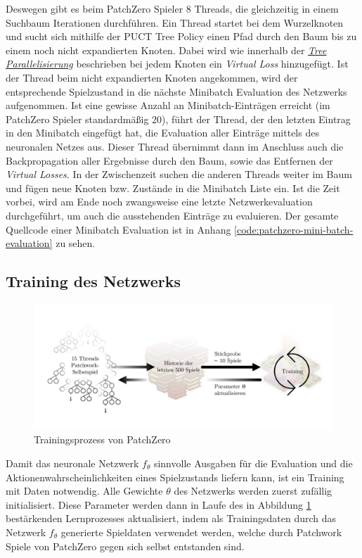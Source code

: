 Deswegen gibt es beim PatchZero Spieler 8 Threads, die gleichzeitig in einem Suchbaum Iterationen durchführen. Ein Thread startet bei dem Wurzelknoten und sucht sich mithilfe der PUCT Tree Policy einen Pfad durch den Baum bis zu einem noch nicht expandierten Knoten. Dabei wird wie innerhalb der \hyperref[text:tree-parallelization]{\emph{Tree Parallelisierung}} beschrieben bei jedem Knoten ein \emph{Virtual Loss} hinzugefügt. Ist der Thread beim nicht expandierten Knoten angekommen, wird der entsprechende Spielzustand in die nächste Minibatch Evaluation des Netzwerks aufgenommen. Ist eine gewisse Anzahl an Minibatch-Einträgen erreicht (im PatchZero Spieler standardmäßig 20), führt der Thread, der den letzten Eintrag in den Minibatch eingefügt hat, die Evaluation aller Einträge mittels des neuronalen Netzes aus. Dieser Thread übernimmt dann im Anschluss auch die Backpropagation aller Ergebnisse durch den Baum, sowie das Entfernen der \emph{Virtual Losses}. In der Zwischenzeit suchen die anderen Threads weiter im Baum und fügen neue Knoten bzw. Zustände in die Minibatch Liste ein. Ist die Zeit vorbei, wird am Ende noch zwangsweise eine letzte Netzwerkevaluation durchgeführt, um auch die ausstehenden Einträge zu evaluieren. Der gesamte Quellcode einer Minibatch Evaluation ist in Anhang \ref{code:patchzero-mini-batch-evaluation} zu sehen.

\subsection{Training des Netzwerks}

\begin{figure}[!ht]
    \centering
    \includegraphics[width=\textwidth]{res/pictures/patch-zero-train.png}
    \caption{Trainingsprozess von PatchZero}
    \label{fig:patch-zero-train}
\end{figure}

Damit das neuronale Netzwerk $f_\theta$ sinnvolle Ausgaben für die Evaluation und die Aktionenwahrscheinlichkeiten eines Spielzustands liefern kann, ist ein Training mit Daten notwendig. Alle Gewichte $\theta$ des Netzwerks werden zuerst zufällig initialisiert. Diese Parameter werden dann in Laufe des in Abbildung \ref{fig:patch-zero-train} bestärkenden Lernprozesses aktualisiert, indem als Trainingsdaten durch das Netzwerk $f_\theta$ generierte Spieldaten verwendet werden, welche durch Patchwork Spiele von PatchZero gegen sich selbst entstanden sind.

